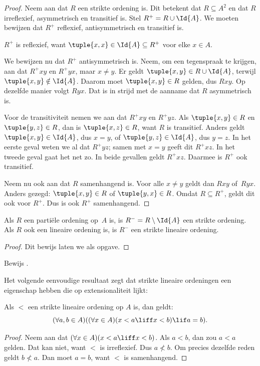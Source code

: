 \documentclass[../../../include/open-logic-section]{subfiles}
\begin{document}
\begin{proof}
Neem aan dat $R$ een strikte ordening is. Dit betekent dat $R \subseteq A^2$ en
dat $R$ irreflexief, asymmetrisch en transitief is. Stel
$R^+ = R \cup \Id{A}$. We moeten bewijzen dat $R^+$ reflexief,
antisymmetrisch en transitief is.

$R^+$ is reflexief, want $\tuple{x, x} \in \Id{A} \subseteq R^+$ voor elke
$x \in A$. 

We bewijzen nu dat $R^+$ antisymmetrisch is. Neem, om een tegenspraak te krijgen,
aan dat $R^+xy$ en $R^+yx$, maar $x \neq y$. Er geldt
$\tuple{x,y} \in R \cup \Id{A}$, terwijl $\tuple{x, y} \notin \Id{A}$.
Daarom moet $\tuple{x, y} \in R$ gelden, dus $Rxy$. Op dezelfde manier volgt
$Ryx$. Dat is in strijd met de aanname dat $R$ asymmetrisch is.

Voor de transitiviteit nemen we aan dat $R^+xy$ en $R^+yz$. Als
$\tuple{x, y} \in R$ en $\tuple{y,z} \in R$, dan is $\tuple{x, z} \in R$,
want $R$ is transitief. Anders geldt $\tuple{x, y} \in \Id{A}$, dus $x = y$,
of $\tuple{y, z} \in \Id{A}$, dus $y = z$. In het eerste geval weten we al dat
$R^+yz$; samen met $x = y$ geeft dit $R^+xz$. In het tweede geval gaat het
net zo. In beide gevallen geldt $R^+xz$. Daarmee is $R^+$ ook transitief.

Neem nu ook aan dat $R$ samenhangend is.
Voor alle $x \neq y$ geldt dan $Rxy$ of~$Ryx$. Anders gezegd:
$\tuple{x, y} \in R$ of $\tuple{y, x} \in R$. Omdat $R \subseteq R^+$,
geldt dit ook voor $R^+$. Dus is ook $R^+$ samenhangend.
\end{proof}

\begin{prop}
Als $R$ een partiële ordening op~$A$ is, is $R^- = R \setminus \Id{A}$ een
strikte ordening. Als $R$ ook een lineaire ordening is, is $R^-$ een strikte
lineaire ordening.
\end{prop}

\begin{proof}
Dit bewijs laten we als opgave.
\end{proof}

\begin{prob}
Bewijs . 
\end{prob}

Het volgende eenvoudige resultaat zegt dat strikte lineaire ordeningen een
eigenschap hebben die op extensionaliteit lijkt:

\begin{prop}
Als $<$ een strikte lineaire ordening op $A$ is, dan geldt:
\[
  (\forall a, b \in A)((\forall x \in A)(x < a \liff x < b) \lif a = b).
\]
\end{prop}

\begin{proof}
Neem aan dat $(\forall x \in A)(x < a \liff x < b)$. Als $a < b$, dan zou
$a < a$ gelden. Dat kan niet, want $<$ is irreflexief. Dus $a \nless b$.
Om precies dezelfde reden geldt $b \nless a$. Dan moet $a = b$, want $<$ is
samenhangend.
\end{proof}
\end{document}
